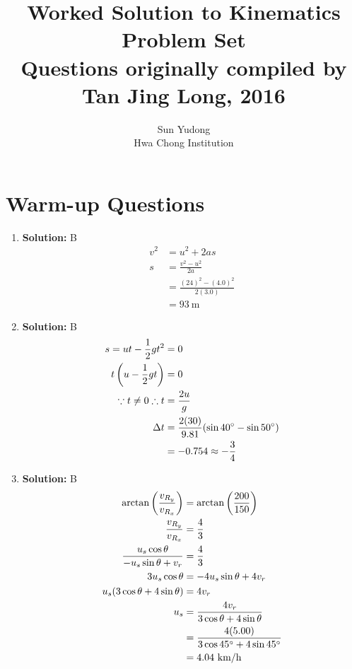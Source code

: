 \documentclass[11pt]{article}
\title{Worked Solution to Kinematics Problem Set\\{{\small Questions originally compiled by Tan Jing Long, 2016}}}
\author{Sun Yudong\\Hwa Chong Institution}
\newcommand{\solution}[1]{\textbf{Solution: } #1 \hspace{5mm}}
\begin{document}
	\maketitle
	\section*{Warm-up Questions}
	\begin{multicols}{2}
		\begin{enumerate}
			\item \solution{B}
			\begin{align*}
				v^2 &= u^2 + 2as \\
				s &= \frac{v^2 - u^2}{2a} \\
				&= \frac{(24)^2 - (4.0)^2}{2(3.0)} \\
				&= 93 ~\text{m}
			\end{align*}
			\item \solution{B}
			\begin{align*}
				s = ut - \frac{1}{2}gt^2 &= 0 \\
				t\left(u-\frac{1}{2}gt\right) &= 0 \\
				\because t \neq 0 \therefore t &= \frac{2u}{g} \\
				\Delta t &= \frac{2(30)}{9.81}(\sin 40\degree-\sin 50\degree) \\
				&= -0.754 \approx -\frac{3}{4}
			\end{align*}
			\item \solution{B}
			\begin{align*}
				\arctan \left(\frac{v_{R_y}}{v_{R_x}}\right) &= \arctan \left(\frac{200}{150}\right) \\
				\frac{v_{R_y}}{v_{R_x}} &= \frac{4}{3} \\
				\frac{u_s \cos \theta}{-u_s \sin \theta + v_r} &= \frac{4}{3} \\
				3u_s\cos \theta &= -4u_s\sin\theta + 4v_r \\
				u_s(3\cos\theta + 4\sin\theta) &= 4v_r \\
				u_s &= \frac{4v_r}{3\cos\theta + 4\sin\theta} \\
				&= \frac{4(5.00)}{3\cos 45\degree + 4\sin 45\degree} \\
				&= 4.04 ~\text{km/h}
 			\end{align*}
		\end{enumerate}
	\end{multicols}
\end{document}
